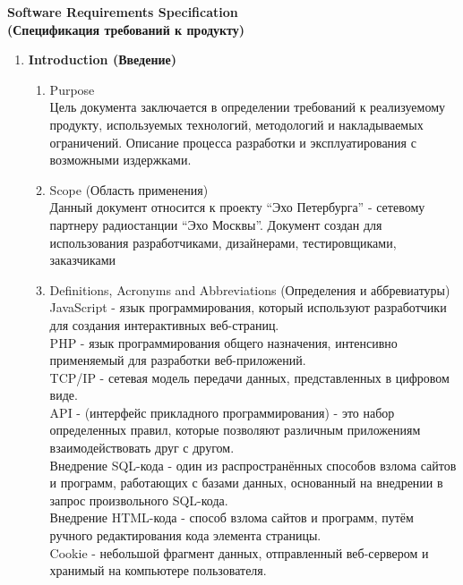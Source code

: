 \thispagestyle{empty}
\BgThispage
\begin{center}
    \LARGE
    \textbf{Software Requirements Specification \\
    (Спецификация требований к продукту)} \\
    \normalsize
\end{center}

\begin{enumerate}
    \item \textbf{Introduction (Введение)}
    \begin{enumerate}[label=1.\arabic*]
        \item Purpose \\
        Цель документа заключается в определении требований к реализуемому продукту, используемых технологий,
        методологий и накладываемых ограничений. Описание процесса разработки и эксплуатирования с возможными издержками.
        \item Scope (Область применения) \\
        Данный документ относится к проекту ``Эхо Петербурга'' - сетевому партнеру радиостанции ``Эхо Москвы''. Документ
        создан для использования разработчиками, дизайнерами, тестировщиками, заказчиками
        \item Definitions, Acronyms and Abbreviations (Определения и аббревиатуры) \\
        JavaScript - язык программирования, который используют разработчики для создания интерактивных веб-страниц. \\
        PHP - язык программирования общего назначения, интенсивно применяемый для разработки веб-приложений. \\
        TCP/IP - сетевая модель передачи данных, представленных в цифровом виде. \\
        API - (интерфейс прикладного программирования) - это набор определенных правил, которые позволяют различным приложениям взаимодействовать друг с другом. \\
        Внедрение SQL-кода - один из распространённых способов взлома сайтов и программ, работающих с базами данных, основанный на внедрении в запрос произвольного SQL-кода. \\
        Внедрение HTML-кода - способ взлома сайтов и программ, путём ручного редактирования кода элемента страницы. \\
        Cookie - небольшой фрагмент данных, отправленный веб-сервером и хранимый на компьютере пользователя.\\

\end{enumerate}
\end{enumerate}
